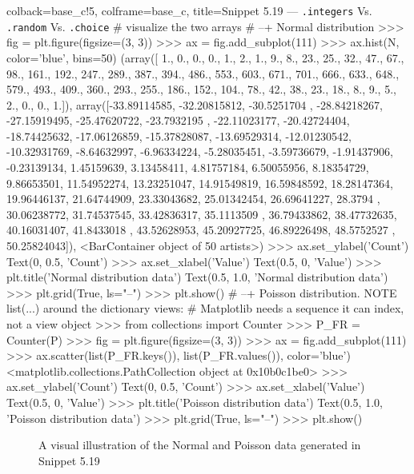\documentclass[a4paper,11pt]{book}
\begin{document}
\begin{pythoncode}[linenos=true,]{colback=base_c!5, colframe=base_c, title=\sffamily Snippet 5.19 --- \texttt{.integers} Vs. \texttt{.random} Vs. \texttt{.choice}}
# visualize the two arrays
# --+ Normal distribution
>>> fig = plt.figure(figsize=(3, 3))
>>> ax = fig.add_subplot(111)
>>> ax.hist(N, color='blue', bins=50)
(array([  1.,   0.,   0.,   0.,   1.,   2.,   1.,   9.,   8.,  23.,  25.,
        32.,  47.,  67.,  98., 161., 192., 247., 289., 387., 394., 486.,
       553., 603., 671., 701., 666., 633., 648., 579., 493., 409., 360.,
       293., 255., 186., 152., 104.,  78.,  42.,  38.,  23.,  18.,   8.,
         9.,   5.,   2.,   0.,   0.,   1.]), array([-33.89114585, -32.20815812, -30.5251704 , -28.84218267,
       -27.15919495, -25.47620722, -23.7932195 , -22.11023177,
       -20.42724404, -18.74425632, -17.06126859, -15.37828087,
       -13.69529314, -12.01230542, -10.32931769,  -8.64632997,
        -6.96334224,  -5.28035451,  -3.59736679,  -1.91437906,
        -0.23139134,   1.45159639,   3.13458411,   4.81757184,
         6.50055956,   8.18354729,   9.86653501,  11.54952274,
        13.23251047,  14.91549819,  16.59848592,  18.28147364,
        19.96446137,  21.64744909,  23.33043682,  25.01342454,
        26.69641227,  28.3794    ,  30.06238772,  31.74537545,
        33.42836317,  35.1113509 ,  36.79433862,  38.47732635,
        40.16031407,  41.8433018 ,  43.52628953,  45.20927725,
        46.89226498,  48.5752527 ,  50.25824043]), <BarContainer object of 50 artists>)
>>> ax.set_ylabel('Count')
Text(0, 0.5, 'Count')
>>> ax.set_xlabel('Value')
Text(0.5, 0, 'Value')
>>> plt.title('Normal distribution data')
Text(0.5, 1.0, 'Normal distribution data')
>>> plt.grid(True, ls="--")
>>> plt.show()
# --+ Poisson distribution. NOTE list(...) around the dictionary views:
#     Matplotlib needs a sequence it can index, not a view object
>>> from collections import Counter
>>> P_FR = Counter(P)
>>> fig = plt.figure(figsize=(3, 3))
>>> ax = fig.add_subplot(111)
>>> ax.scatter(list(P_FR.keys()), list(P_FR.values()), color='blue')
<matplotlib.collections.PathCollection object at 0x10b0c1be0>
>>> ax.set_ylabel('Count')
Text(0, 0.5, 'Count')
>>> ax.set_xlabel('Value')
Text(0.5, 0, 'Value')
>>> plt.title('Poisson distribution data')
Text(0.5, 1.0, 'Poisson distribution data')
>>> plt.grid(True, ls="--")
>>> plt.show()
\end{pythoncode}

\begin{figure}[!htbp]
	\centering
	
	
	\caption{A visual illustration of the Normal and Poisson data generated in Snippet 5.19}
	\label{fig:normal_and_poisson_distros}
\end{figure}
\end{document}
